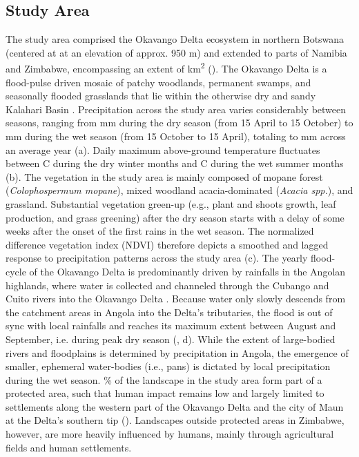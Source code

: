\documentclass[abstract=on,10pt,a4paper,bibliography=totocnumbered]{article}
\newcommand{\inputy}[1]{\unskip}
\begin{document}
\subsection{Study Area}

The study area comprised the Okavango Delta ecosystem in northern Botswana
(centered at \inputy{GeneralMetrics/StudyAreaCenter.tex} at an elevation of
approx. 950 m) and extended to parts of Namibia and Zimbabwe, encompassing an
extent of \inputy{GeneralMetrics/SizeStudyArea.tex} km\textsuperscript{2}
(). The Okavango Delta is a flood-pulse driven mosaic of
patchy woodlands, permanent swamps, and seasonally flooded grasslands that lie
within the otherwise dry and sandy Kalahari Basin \citep{Wilson.1976,
Ramberg.2006, Mendelsohn.2010}. Precipitation across the study area varies
considerably between seasons, ranging from
\inputy{GeneralMetrics/MinimumPrecipitation.tex} mm during the dry season (from
15 April to 15 October) to \inputy{GeneralMetrics/MaximumPrecipitation.tex} mm
during the wet season (from 15 October to 15 April), totaling to
\inputy{GeneralMetrics/TotalPrecipitation.tex} mm across an average year
(a). Daily maximum above-ground temperature fluctuates between
\inputy{GeneralMetrics/MinimumTemperature.tex}\degree C during the dry winter
months and \inputy{GeneralMetrics/MaximumTemperature.tex}\degree C during the
wet summer months (b). The vegetation in the study area is
mainly composed of mopane forest (\textit{Colophospermum mopane}), mixed
woodland acacia-dominated (\textit{Acacia spp.}), and grassland. Substantial
vegetation green-up (e.g., plant and shoots growth, leaf production, and grass
greening) after the dry season starts with a delay of some weeks after the onset
of the first rains in the wet season. The normalized difference vegetation index
(NDVI) therefore depicts a smoothed and lagged response to precipitation
patterns across the study area (c). The yearly flood-cycle of
the Okavango Delta is predominantly driven by rainfalls in the Angolan
highlands, where water is collected and channeled through the Cubango and Cuito
rivers into the Okavango Delta \citep{McCarthy.2003, Gumbricht.2004,
Mendelsohn.2010}. Because water only slowly descends from the catchment areas in
Angola into the Delta's tributaries, the flood is out of sync with local
rainfalls and reaches its maximum extent between August and September, i.e.
during peak dry season (\citealp{Wolski.2017}, d). While the
extent of large-bodied rivers and floodplains is determined by precipitation in
Angola, the emergence of smaller, ephemeral water-bodies (i.e., pans) is
dictated by local precipitation during the wet season.
\inputy{GeneralMetrics/PercentageProtected.tex}\% of the landscape in the study
area form part of a protected area, such that human impact remains low and
largely limited to settlements along the western part of the Okavango Delta and
the city of Maun at the Delta's southern tip (). Landscapes
outside protected areas in Zimbabwe, however, are more heavily influenced by
humans, mainly through agricultural fields and human settlements.
\end{document}
